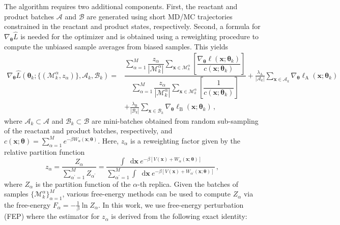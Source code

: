 \documentclass{article}
\numberwithin{equation}{section}
\def\*#1{\mathbf{#1}}
\newcommand*\diff{\mathop{}\!\mathrm{d}}
\theoremstyle{definition}
\theoremstyle{remark}
\def\thetab{\boldsymbol{\theta}}
\begin{document}
The algorithm requires two additional components.
First, the reactant and product batches $ \mathcal{A} $ and $ \mathcal{B} $ are generated using short MD/MC trajectories constrained in the reactant and product states, respectively.
Second, a formula for $\nabla_{\thetab} \hat{L}$ is needed for the optimizer and is obtained using a reweighting procedure \cite{thiede2016eigenvector} to compute the unbiased sample averages from biased samples. This yields
\begin{align}
\nabla_{\thetab} \hat{L}\left(\thetab_k;  \{ (\mathcal{M}^\alpha_k, z_\alpha) \}, \mathcal{A}_k, \mathcal{B}_k \right) =&  \dfrac{\sum\limits_{\alpha=1}^M  \dfrac{z_{\alpha}}{|\mathcal{M}^\alpha_k|}\sum\limits_{\* x \in \mathcal{M}^\alpha_k}  \left[\dfrac{\nabla_{\thetab} \ell(\* x; \thetab_{k})}{c(\* x; \thetab_k)} \right]  }{ \sum\limits_{\alpha=1}^M \dfrac{z_{\alpha}}{|\mathcal{M}^\alpha_k|}\sum\limits_{\* x \in \mathcal{M}^\alpha_k} \left[\dfrac{1}{c(\* x; \thetab_k) } \right]  } +\frac{\lambda_\mathrm{A}}{|\mathcal{A}_k|} \sum\limits_{\* x \in \mathcal{A}_k} \nabla_{\thetab} \ell_\mathrm{A}(\* x; \thetab_{k}) \nonumber
\\
                                                                                                                        &+\frac{\lambda_\mathrm{B}}{|\mathcal{B}_k|} \sum\limits_{\* x \in \mathcal{B}_k}\nabla_{\thetab} \ell_\mathrm{B}(\* x; \thetab_{k}) \,, \label{eq:basemethod_grad}
\end{align}
where $\mathcal{A}_k \subset \mathcal{A}$ and $\mathcal{B}_k \subset \mathcal{B}$ are mini-batches obtained from random sub-sampling of the reactant and product batches, respectively, and $c(\* x; \thetab) = \sum_{\alpha=1}^M e^{-\beta W_\alpha(\* x; \thetab)}$. Here, $z_\alpha$ is a reweighting factor given by the relative partition function
\begin{equation}
    z_\alpha = \frac{Z_\alpha}{\sum_{\alpha^\prime=1}^M Z_{\alpha^\prime}}=\dfrac{\int \diff \* x \ e^{-\beta[V(\* x)+W_\alpha (\* x; \thetab)]}}{\sum_{\alpha^\prime=1}^M \int \diff \* x \ e^{-\beta[V(\* x)+W_{\alpha^\prime}(\* x; \thetab)]}} \,, \label{eq:zalphadef}
\end{equation}
where $Z_\alpha$ is the partition function of the $\alpha$-th replica.
Given the batches of samples $ \{ \mathcal{M}^\alpha_{k} \}_{\alpha=1}^M$, various free-energy methods \cite{stoltz2010free} can be used to compute $Z_\alpha$ via the free-energy $F_\alpha = -\frac{1}{\beta} \ln Z_\alpha$. In this work, we use free-energy perturbation (FEP) \cite{zwanzig1954high} where the estimator for $z_\alpha$ is derived from the following exact identity: 
\end{document}
